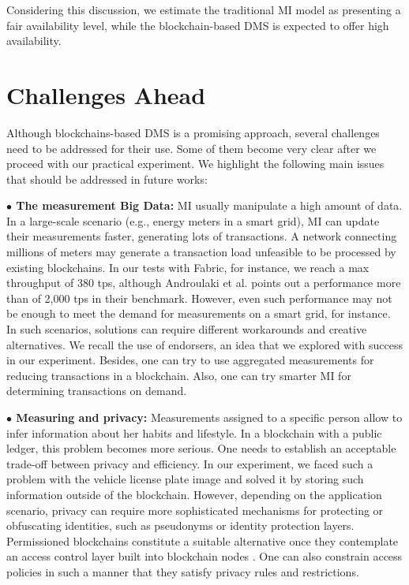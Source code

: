 \documentclass[journal]{IEEEtran}
\begin{document}
Considering this discussion, we estimate the traditional MI model as presenting a fair availability level, while the blockchain-based DMS is expected to offer high availability.

\section{Challenges Ahead}
Although blockchains-based DMS is a promising approach, several challenges need to be addressed for their use.
Some of them become very clear after we proceed with our practical experiment.
We highlight the following main issues that should be addressed in future works:

\textbf{$\bullet$ The measurement Big Data:} MI usually manipulate a high amount of data. In a large-scale scenario (e.g., energy meters in a smart grid), MI can update their measurements faster, generating lots of transactions. 
A network connecting millions of meters may generate a transaction load unfeasible to be processed by existing blockchains. 
In our tests with Fabric, for instance, we reach a max throughput of 380 tps, although Androulaki et al. \cite{Androulaki2018} points out a performance more than of 2,000 tps in their benchmark. 
However, even such performance may not be enough to meet the demand for measurements on a smart grid, for instance.
In such scenarios, solutions can require different workarounds and creative alternatives.
We recall the use of endorsers, an idea that we explored with success in our experiment.
Besides, one can try to use aggregated measurements for reducing transactions in a blockchain. 
Also, one can try smarter MI for determining transactions on demand.


\textbf{$\bullet$ Measuring and privacy:} Measurements assigned to a specific person allow to infer information about her habits and lifestyle. 
In a blockchain with a public ledger, this problem becomes more serious. 
One needs to establish an acceptable trade-off between privacy and efficiency.
In our experiment, we faced such a problem with the vehicle license plate image and solved it by storing such information outside of the blockchain.
However, depending on the application scenario, privacy can require more sophisticated mechanisms for protecting or obfuscating identities, such as pseudonyms or identity protection layers. 
Permissioned blockchains constitute a suitable alternative once they contemplate an access control layer built into blockchain nodes \cite{Vukolic2016}. 
One can also constrain access policies in such a manner that they satisfy privacy rules and restrictions.
\end{document}
